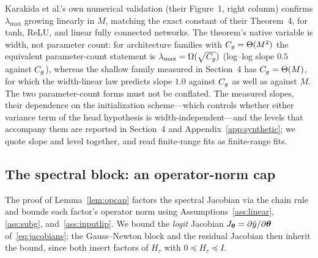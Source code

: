 \begin{remark}
\label{rem:phi_scaling_empirical}
Karakida et al.'s own numerical validation (their Figure~1, right column)
confirms $\lambda_{\max}$ growing linearly in $M$, matching the exact
constant of their Theorem~4, for tanh, ReLU, and linear fully connected
networks. The theorem's native variable is width, not parameter count: for
architecture families with $C_g = \Theta(M^2)$ the equivalent
parameter-count statement is $\lambda_{\max} = \Omega(\sqrt{C_g})$
(log--log slope $0.5$ against $C_g$), whereas the shallow family measured in
Section~4 has $C_g = \Theta(M)$, for which the width-linear law predicts
slope $1.0$ against $C_g$ as well as against $M$. The two parameter-count
forms must not be conflated. The measured slopes, their dependence on the
initialization scheme---which controls whether either variance term of the
head hypothesis is width-independent---and the levels that accompany them
are reported in Section~4 and Appendix~\ref{app:synthetic}; we quote slope
and level together, and read finite-range fits as finite-range fits.
\end{remark}

\subsection{The spectral block: an operator-norm cap}
\label{app:cap}

The proof of Lemma~\ref{lem:opcap} factors the spectral Jacobian via the
chain rule and bounds each factor's operator norm using
Assumptions~\ref{ass:linear}, \ref{ass:subg}, and~\ref{ass:inputlip}. We
bound the \emph{logit} Jacobian $J_{\boldsymbol{\theta}} = \partial \hat{y}/\partial
{\boldsymbol{\theta}}$ of~\eqref{eq:jacobians}; the Gauss--Newton block and the residual
Jacobian then inherit the bound, since both insert factors of $H_\tau$ with
$0 \preceq H_\tau \preceq I$.

